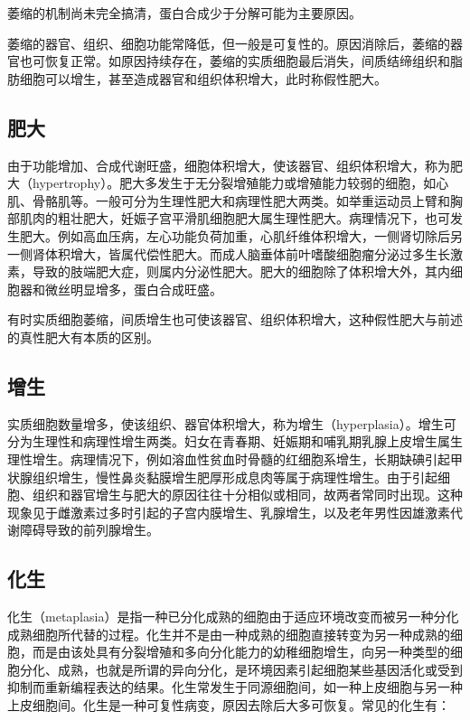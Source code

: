 萎缩的机制尚未完全搞清，蛋白合成少于分解可能为主要原因。

萎缩的器官、组织、细胞功能常降低，但一般是可复性的。原因消除后，萎缩的器官也可恢复正常。如原因持续存在，萎缩的实质细胞最后消失，间质结缔组织和脂肪细胞可以增生，甚至造成器官和组织体积增大，此时称假性肥大。

\subsection{肥大}

由于功能增加、合成代谢旺盛，细胞体积增大，使该器官、组织体积增大，称为肥大（hypertrophy）。肥大多发生于无分裂增殖能力或增殖能力较弱的细胞，如心肌、骨骼肌等。一般可分为生理性肥大和病理性肥大两类。如举重运动员上臂和胸部肌肉的粗壮肥大，妊娠子宫平滑肌细胞肥大属生理性肥大。病理情况下，也可发生肥大。例如高血压病，左心功能负荷加重，心肌纤维体积增大，一侧肾切除后另一侧肾体积增大，皆属代偿性肥大。而成人脑垂体前叶嗜酸细胞瘤分泌过多生长激素，导致的肢端肥大症，则属内分泌性肥大。肥大的细胞除了体积增大外，其内细胞器和微丝明显增多，蛋白合成旺盛。

有时实质细胞萎缩，间质增生也可使该器官、组织体积增大，这种假性肥大与前述的真性肥大有本质的区别。

\subsection{增生}

实质细胞数量增多，使该组织、器官体积增大，称为增生（hyperplasia）。增生可分为生理性和病理性增生两类。妇女在青春期、妊娠期和哺乳期乳腺上皮增生属生理性增生。病理情况下，例如溶血性贫血时骨髓的红细胞系增生，长期缺碘引起甲状腺组织增生，慢性鼻炎黏膜增生肥厚形成息肉等属于病理性增生。由于引起细胞、组织和器官增生与肥大的原因往往十分相似或相同，故两者常同时出现。这种现象见于雌激素过多时引起的子宫内膜增生、乳腺增生，以及老年男性因雄激素代谢障碍导致的前列腺增生。

\subsection{化生}

化生（metaplasia）是指一种已分化成熟的细胞由于适应环境改变而被另一种分化成熟细胞所代替的过程。化生并不是由一种成熟的细胞直接转变为另一种成熟的细胞，而是由该处具有分裂增殖和多向分化能力的幼稚细胞增生，向另一种类型的细胞分化、成熟，也就是所谓的异向分化，是环境因素引起细胞某些基因活化或受到抑制而重新编程表达的结果。化生常发生于同源细胞间，如一种上皮细胞与另一种上皮细胞间。化生是一种可复性病变，原因去除后大多可恢复。常见的化生有：


